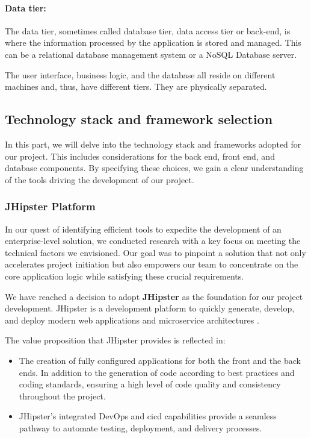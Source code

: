 \paragraph*{Data tier:}
The data tier, sometimes called database tier, data access tier or back-end, is where the information
processed by the application is stored and managed. This can be a relational database management system
or a NoSQL Database server.

The user interface, business logic, and the database all reside on different machines and, thus, have
different tiers. They are physically separated.



\subsection{Technology stack and framework selection}
In this part, we will delve into the technology stack and frameworks adopted for our project.
This includes considerations for the back end, front end, and database components. By specifying
these choices, we gain a clear understanding of the tools driving the development of our project.

\subsubsection{JHipster Platform}
In our quest of identifying efficient tools to expedite the development of an enterprise-level solution,
we conducted research with a key focus on meeting the technical factors we envisioned. Our goal was to
pinpoint a solution that not only accelerates project initiation but also empowers our team to concentrate
on the core application logic while satisfying these crucial requirements.

We have reached a decision to adopt \textbf{JHipster} as the foundation for our project development.
JHipster is a development platform to quickly generate, develop, and deploy modern web applications
and microservice architectures \cite{jhipster}.

\noindent The value proposition that JHipster provides is reflected in:

\begin{itemize}
      \item The creation of fully configured applications for both the front and the back ends.
            In addition to the generation of code according to best practices and coding standards,
            ensuring a high level of code quality and consistency throughout the project.
      \item JHipster's integrated DevOps and \acrshort{cicd} capabilities provide a seamless pathway
            to automate testing, deployment, and delivery processes.
\end{itemize}

